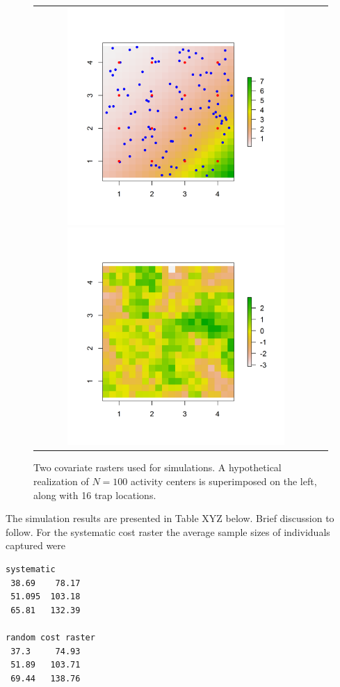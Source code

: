 \documentclass[12pt]{article}
\begin{document}
\begin{figure}
\begin{tabular}{cc}
\includegraphics[height=3.25in,width=3.25in]{figs/raster_withN100}
\includegraphics[height=3.25in,width=3.25in]{figs/raster_krige} &
\end{tabular}
\caption{Two covariate rasters used for simulations. A hypothetical
  realization of $N=100$ activity centers is superimposed on the left,
along with 16 trap locations. }
\label{ecoldist.fig.raster100}
\end{figure}

The simulation results are presented in Table XYZ below. Brief
discussion to follow. 
For the systematic cost raster the average sample sizes of individuals
captured were 
\begin{verbatim}
systematic 
 38.69    78.17
 51.095  103.18
 65.81   132.39

random cost raster
 37.3     74.93
 51.89   103.71
 69.44   138.76
\end{verbatim}
\end{document}
